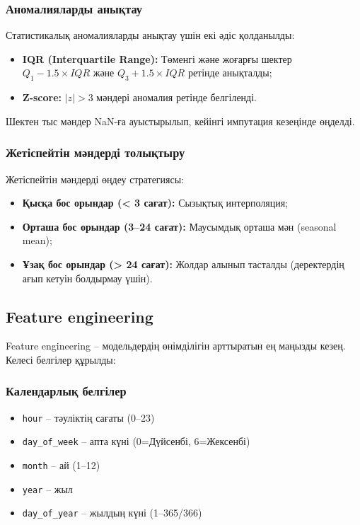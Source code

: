 \documentclass[12pt,a4paper]{article}
\begin{document}
\subsubsection{Аномалияларды анықтау}

Статистикалық аномалияларды анықтау үшін екі әдіс қолданылды:
\begin{itemize}
\item \textbf{IQR (Interquartile Range):} Төменгі және жоғарғы шектер $Q_1 - 1.5 \times IQR$ және $Q_3 + 1.5 \times IQR$ ретінде анықталды;
\item \textbf{Z-score:} $|z| > 3$ мәндері аномалия ретінде белгіленді.
\end{itemize}

Шектен тыс мәндер NaN-ға ауыстырылып, кейінгі импутация кезеңінде өңделді.

\subsubsection{Жетіспейтін мәндерді толықтыру}

Жетіспейтін мәндерді өңдеу стратегиясы:
\begin{itemize}
\item \textbf{Қысқа бос орындар (< 3 сағат):} Сызықтық интерполяция;
\item \textbf{Орташа бос орындар (3–24 сағат):} Маусымдық орташа мән (seasonal mean);
\item \textbf{Ұзақ бос орындар (> 24 сағат):} Жолдар алынып тасталды (деректердің ағып кетуін болдырмау үшін).
\end{itemize}

\subsection{Feature engineering}

Feature engineering – модельдердің өнімділігін арттыратын ең маңызды кезең. Келесі белгілер құрылды:

\subsubsection{Календарлық белгілер}

\begin{itemize}
\item \texttt{hour} – тәуліктің сағаты (0–23)
\item \texttt{day\_of\_week} – апта күні (0=Дүйсенбі, 6=Жексенбі)
\item \texttt{month} – ай (1–12)
\item \texttt{year} – жыл
\item \texttt{day\_of\_year} – жылдың күні (1–365/366)
\end{itemize}
\end{document}
